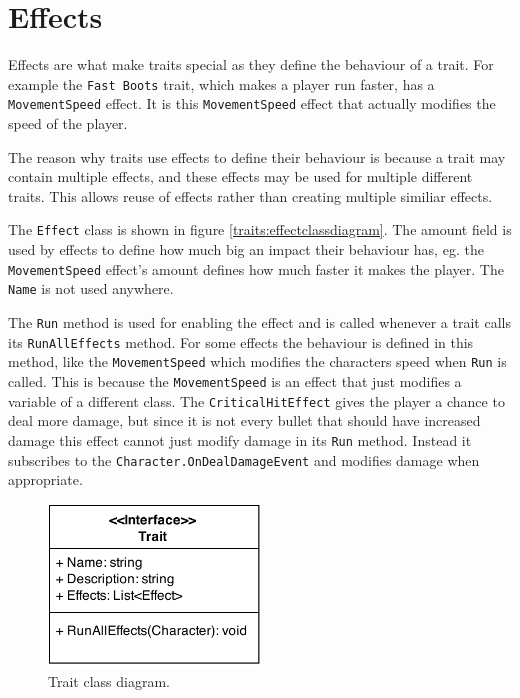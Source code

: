 \section{Effects}
\label{sec:modules:effects}

Effects are what make traits special as they define the behaviour of a trait. For example the \texttt{Fast Boots} trait, which makes a player run faster, has a \texttt{MovementSpeed} effect. It is this \texttt{MovementSpeed} effect that actually modifies the speed of the player.

The reason why traits use effects to define their behaviour is because a trait may contain multiple effects, and these effects may be used for multiple different traits. This allows reuse of effects rather than creating multiple similiar effects.

The \texttt{Effect} class is shown in figure \ref{traits:effectclassdiagram}. The amount field is used by effects to define how much big an impact their behaviour has, eg. the \texttt{MovementSpeed} effect's amount defines how much faster it makes the player. The \texttt{Name} is not used anywhere.

The \texttt{Run} method is used for enabling the effect and is called whenever a trait calls its \texttt{RunAllEffects} method. For some effects the behaviour is defined in this method, like the \texttt{MovementSpeed} which modifies the characters speed when \texttt{Run} is called. This is because the \texttt{MovementSpeed} is an effect that just modifies a variable of a different class.
The \texttt{CriticalHitEffect} gives the player a chance to deal more damage, but since it is not every bullet that should have increased damage this effect cannot just modify damage in its \texttt{Run} method. Instead it subscribes to the \texttt{Character.OnDealDamageEvent} and modifies damage when appropriate.

\begin{figure}
\centering
\includegraphics[width=0.5\textwidth]{figures/traits/TraitClassDiagram.png}
\caption{Trait class diagram.}
\label{traits:traitclassdiagram}
\end{figure}

